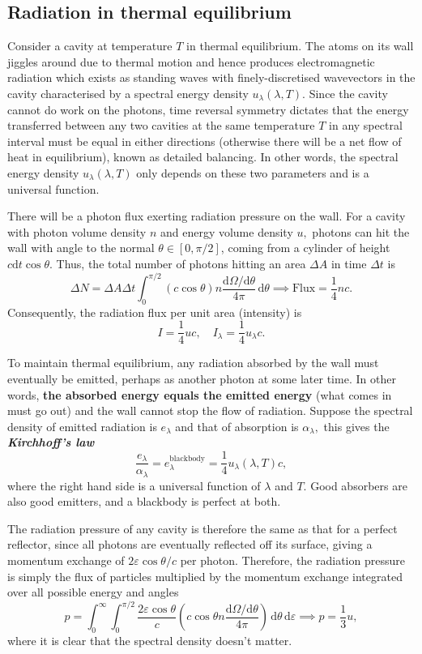 \documentclass{article}
\theoremstyle{nonumberplain}
\begin{document}
\subsection{Radiation in thermal equilibrium}
Consider a cavity at temperature $T$ in thermal equilibrium. The atoms on its wall jiggles around due to thermal motion and hence produces electromagnetic radiation which exists as standing waves with finely-discretised wavevectors in the cavity characterised by a spectral energy density $u_\lambda (\lambda , T).$ Since the cavity cannot do work on the photons, time reversal symmetry dictates that the energy transferred between any two cavities at the same temperature $T$ in any spectral interval must be equal in either directions (otherwise there will be a net flow of heat in equilibrium), known as detailed balancing. In other words, the spectral energy density $u_\lambda(\lambda, T)$ only depends on these two parameters and is a universal function. 

There will be a photon flux exerting radiation pressure on the wall. For a cavity with photon volume density $n$ and energy volume density $u,$ photons can hit the wall with angle to the normal $\theta \in [0, \pi / 2]$, coming from a cylinder of height $c \mathrm{d} t \cos{\theta}.$ Thus, the total number of photons hitting an area $\Delta A$ in time $\Delta  t$ is 
\[
    \Delta N = \Delta A \Delta t \int_{0}^{\pi /2 } (c \cos \theta) n \frac{\mathrm{d} \Omega / \mathrm{d} \theta }{4\pi }\,\mathrm{d}\theta   \implies \boxed{\mathrm{Flux} = \frac{1}{4} n c }. 
\]
Consequently, the radiation flux per unit area (intensity) is 
\[
    I = \frac{1}{4} u c, \quad I_{\lambda} = \frac{1}{4} u_\lambda c.
\]

To maintain thermal equilibrium, any radiation absorbed by the wall must eventually be emitted, perhaps as another photon at some later time. In other words, \textbf{the absorbed energy equals the emitted energy} (what comes in must go out) and the wall cannot stop the flow of radiation. Suppose the spectral density of emitted radiation is $e_\lambda$ and that of absorption is $\alpha_\lambda,$ this gives the \textit{\textbf{Kirchhoff's law}} 
\[
    \boxed{
        \frac{e_\lambda }{\alpha_\lambda} = e^{\mathrm{blackbody} }_{\lambda} = \frac{1}{4}u_\lambda(\lambda, T) c, 
    }
\]
where the right hand side is a universal function of $\lambda$ and $T.$ Good absorbers are also good emitters, and a blackbody is perfect at both. 

The radiation pressure of any cavity is therefore the same as that for a perfect reflector, since all photons are eventually reflected off its surface, giving a momentum exchange of $2 \varepsilon \cos{\theta} / c$ per photon. Therefore, the radiation pressure is simply the flux of particles multiplied by the momentum exchange integrated over all possible energy and angles
\[
    p = \int_{0}^{\infty} \int_{0}^{\pi/2}  \frac{2 \varepsilon \cos{\theta}}{c}  \left( c \cos \theta n \frac{\mathrm{d} \Omega / \mathrm{d} \theta }{4\pi } \right) \,\mathrm{d}\theta   \,\mathrm{d}\varepsilon \implies \boxed{p = \frac{1}{3}u,}   
\]
where it is clear that the spectral density doesn't matter. 
\end{document}
